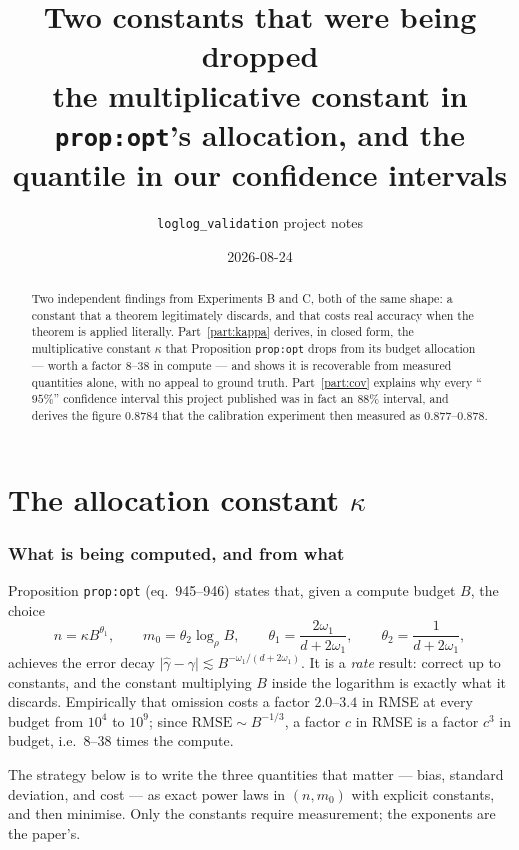 \documentclass[11pt]{article}
\title{Two constants that were being dropped\\
\large the multiplicative constant in \texttt{prop:opt}'s allocation,
and the quantile in our confidence intervals}
\author{\texttt{loglog\_validation} project notes}
\date{2026-08-24}
\begin{document}
\maketitle

\begin{abstract}
Two independent findings from Experiments B and C, both of the same shape: a
constant that a theorem legitimately discards, and that costs real accuracy
when the theorem is applied literally. Part~\ref{part:kappa} derives, in closed
form, the multiplicative constant $\kappa$ that Proposition \texttt{prop:opt}
drops from its budget allocation --- worth a factor $8$--$38$ in compute ---
and shows it is recoverable from measured quantities alone, with no appeal to
ground truth. Part~\ref{part:cov} explains why every ``$95\%$'' confidence
interval this project published was in fact an $88\%$ interval, and derives the
figure $0.8784$ that the calibration experiment then measured as
$0.877$--$0.878$.
\end{abstract}

\tableofcontents

\part{The allocation constant \texorpdfstring{$\kappa$}{kappa}}
\label{part:kappa}

\section{What is being computed, and from what}

Proposition \texttt{prop:opt} (eq.~945--946) states that, given a compute
budget $B$, the choice
\begin{equation}
  n = \kappa B^{\theta_1}, \qquad m_0 = \theta_2\log_\rho B,
  \qquad \theta_1 = \frac{2\omega_1}{d+2\omega_1},
  \qquad \theta_2 = \frac{1}{d+2\omega_1},
  \label{eq:propopt}
\end{equation}
achieves the error decay $\lvert\hat\gamma-\gamma\rvert \lesssim
B^{-\omega_1/(d+2\omega_1)}$. It is a \emph{rate} result: correct up to
constants, and the constant multiplying $B$ inside the logarithm is exactly
what it discards. Empirically that omission costs a factor $2.0$--$3.4$ in
RMSE at every budget from $10^4$ to $10^9$; since $\mathrm{RMSE}\sim
B^{-1/3}$, a factor $c$ in RMSE is a factor $c^3$ in budget, i.e.\ $8$--$38$
times the compute.

The strategy below is to write the three quantities that matter --- bias,
standard deviation, and cost --- as exact power laws in $(n,m_0)$ with
explicit constants, and then minimise. Only the constants require
measurement; the exponents are the paper's.
\end{document}
